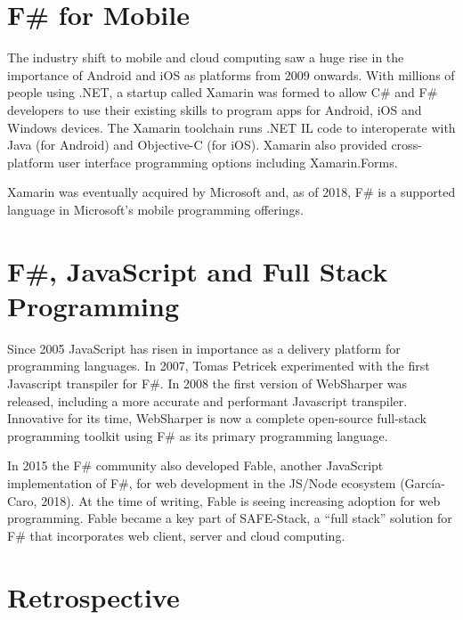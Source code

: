 \documentclass[acmsmall,review]{acmart}\settopmatter{printfolios=true,printccs=false,printacmref=false}
\begin{document}
\section*{F\# for Mobile}


The industry shift to mobile and cloud computing saw a huge rise in the importance of Android and iOS as platforms from 2009 onwards.  With millions of people using .NET, a startup called Xamarin was formed to allow C\# and F\# developers to use their existing skills to program apps for Android, iOS and Windows devices.  The Xamarin toolchain runs .NET IL code to interoperate with Java (for Android) and Objective-C (for iOS).  Xamarin also provided cross-platform user interface programming options including Xamarin.Forms. 

Xamarin was eventually acquired by Microsoft and, as of 2018, F\# is a supported language in Microsoft’s mobile programming offerings.


\section*{F\#, JavaScript and Full Stack Programming}

Since 2005 JavaScript has risen in importance as a delivery platform for programming languages. In 2007, Tomas Petricek experimented with the first Javascript transpiler for F\#. In 2008 the first version of WebSharper was released, including a more accurate and performant Javascript transpiler.  Innovative for its time, WebSharper is now a complete open-source full-stack programming toolkit using F\# as its primary programming language.

In 2015 the F\# community also developed Fable, another JavaScript implementation of F\#, for web development in the JS/Node ecosystem (García-Caro, 2018). At the time of writing, Fable is seeing increasing adoption for web programming.  Fable became a key part of SAFE-Stack, a “full stack” solution for F\# that incorporates web client, server and cloud computing. 


\section*{Retrospective}
\end{document}
